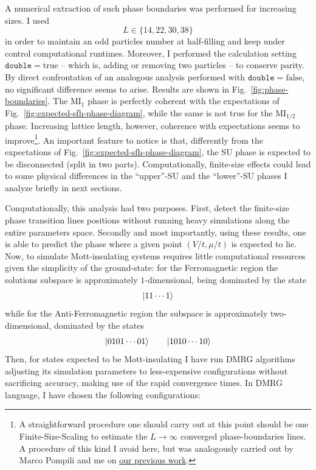 A numerical extraction of such phase boundaries was performed for increasing sizes. I used
\[
	L \in \lbrace 14, 22, 30, 38 \rbrace
\]
in order to maintain an odd particles number at half-filling and keep under control computational runtimes. Moreover, I performed the calculation setting $\texttt{double}=\mathrm{true}$ -- which is, adding or removing two particles -- to conserve parity. By direct confrontation of an analogous analysis performed with $\texttt{double}=\mathrm{false}$, no significant difference seems to arise. Results are shown in Fig.~\ref{fig:phase-boundaries}. The $\mathrm{MI}_1$ phase is perfectly coherent with the expectations of Fig.~\ref{fig:expected-sfh-phase-diagram}, while the same is not true for the $\mathrm{MI}_{1/2}$ phase. Increasing lattice length, however, coherence with expectations seems to improve\footnote{
	A straightforward procedure one should carry out at this point should be one Finite-Size-Scaling to estimate the $L \to \infty$ converged phase-boundaries lines. A procedure of this kind I avoid here, but was analogously carried out by Marco Pompili and me on \href{https://github.com/mrc-pop/BoseHubbardDMRG}{our previous work}.
}. An important feature to notice is that, differently from the expectations of Fig.~\ref{fig:expected-sfh-phase-diagram}, the $\mathrm{SU}$ phase is expected to be disconnected (split in two parts). Computationally, finite-size effects could lead to some physical differences in the ``upper''-$\mathrm{SU}$ and the ``lower''-$\mathrm{SU}$ phases I analyze briefly in next sections.

Computationally, this analysis had two purposes. First, detect the finite-size phase transition lines positions without running heavy simulations along the entire parameters space. Secondly and most importantly, using these results, one is able to predict the phase where a given point $(V/t, \mu/t)$ is expected to lie. Now, to simulate Mott-insulating systems requires little computational resources given the simplicity of the ground-state: for the Ferromagnetic region the solutions subspace is approximately $1$-dimensional, being dominated by the state
\[
	\ket{11 \cdots 1}
\]
while for the Anti-Ferromagnetic region the subspace is approximately two-dimensional, dominated by the states
\[
	\ket{0101\cdots01}
	\qquad
	\ket{1010\cdots10}
\]
Then, for states expected to be Mott-insulating I have run DMRG algorithms adjusting its simulation parameters to less-expensive configurations without sacrificing accuracy, making use of the rapid convergence times. In DMRG language, I have chosen the following configurations:

